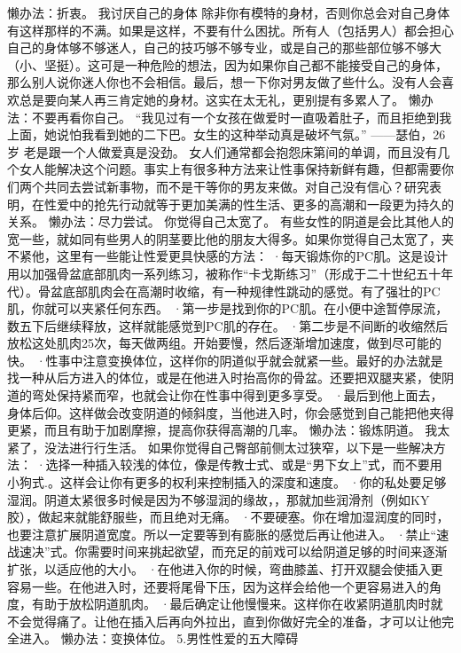 \documentclass[12pt,UTF8]{ctexbook}
\begin{document}
懒办法：折衷。
我讨厌自己的身体
除非你有模特的身材，否则你总会对自己身体有这样那样的不满。如果是这样，不要有什么困扰。所有人（包括男人）都会担心自己的身体够不够迷人，自己的技巧够不够专业，或是自己的那些部位够不够大（小、坚挺）。这可是一种危险的想法，因为如果你自己都不能接受自己的身体，那么别人说你迷人你也不会相信。最后，想一下你对男友做了些什么。没有人会喜欢总是要向某人再三肯定她的身材。这实在太无礼，更别提有多累人了。
懒办法：不要再看你自己。
“我见过有一个女孩在做爱时一直吸着肚子，而且拒绝到我上面，她说怕我看到她的二下巴。女生的这种举动真是破坏气氛。”
——瑟伯，26岁
老是跟一个人做爱真是没劲。
女人们通常都会抱怨床第间的单调，而且没有几个女人能解决这个问题。事实上有很多种方法来让性事保持新鲜有趣，但都需要你们两个共同去尝试新事物，而不是干等你的男友来做。对自己没有信心？研究表明，在性爱中的抢先行动就等于更加美满的性生活、更多的高潮和一段更为持久的关系。
懒办法：尽力尝试。
你觉得自己太宽了。
有些女性的阴道是会比其他人的宽一些，就如同有些男人的阴茎要比他的朋友大得多。如果你觉得自己太宽了，夹不紧他，这里有一些能让性爱更具快感的方法：
·每天锻炼你的PC肌。这是设计用以加强骨盆底部肌肉一系列练习，被称作“卡戈斯练习”（形成于二十世纪五十年代）。骨盆底部肌肉会在高潮时收缩，有一种规律性跳动的感觉。有了强壮的PC肌，你就可以夹紧任何东西。
·第一步是找到你的PC肌。在小便中途暂停尿流，数五下后继续释放，这样就能感觉到PC肌的存在。
·第二步是不间断的收缩然后放松这处肌肉25次，每天做两组。开始要慢，然后逐渐增加速度，做到尽可能的快。
·性事中注意变换体位，这样你的阴道似乎就会就紧一些。最好的办法就是找一种从后方进入的体位，或是在他进入时抬高你的骨盆。还要把双腿夹紧，使阴道的弯处保持紧而窄，也就会让你在性事中得到更多享受。
·最后到他上面去，身体后仰。这样做会改变阴道的倾斜度，当他进入时，你会感觉到自己能把他夹得更紧，而且有助于加剧摩擦，提高你获得高潮的几率。
懒办法：锻炼阴道。
我太紧了，没法进行行生活。
如果你觉得自己臀部前侧太过狭窄，以下是一些解决方法：
·选择一种插入较浅的体位，像是传教士式、或是“男下女上”式，而不要用小狗式.。这样会让你有更多的权利来控制插入的深度和速度。
·你的私处要足够湿润。阴道太紧很多时候是因为不够湿润的缘故，，那就加些润滑剂（例如KY胶），做起来就能舒服些，而且绝对无痛。
·不要硬塞。你在增加湿润度的同时，也要注意扩展阴道宽度。所以一定要等到有膨胀的感觉后再让他进入。
·禁止“速战速决”式。你需要时间来挑起欲望，而充足的前戏可以给阴道足够的时间来逐渐扩张，以适应他的大小。
·在他进入你的时候，弯曲膝盖、打开双腿会使插入更容易一些。在他进入时，还要将尾骨下压，因为这样会给他一个更容易进入的角度，有助于放松阴道肌肉。
·最后确定让他慢慢来。这样你在收紧阴道肌肉时就不会觉得痛了。让他在插入后再向外拉出，直到你做好完全的准备，才可以让他完全进入。
懒办法：变换体位。
5.男性性爱的五大障碍
\end{document}
